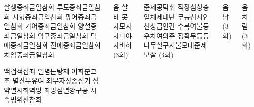 \documentclass[20pt, a0paper ]{tikzposter}
\begin{document}
\begin{columns}
{				\begin{LARGE}
살생중죄금일참회 투도중죄금일참회 사행중죄금일참회
망어중죄금일참회 기어중죄금일참회 양설중죄금일참회
악구중죄금일참회 탐애중죄금일참회 진애중죄금일참회
치암중죄금일참회

백겁적집죄 일념돈탕제 여화분고초 멸진무유여
죄무자성종심기 심약멸시죄역망 죄망심멸양구공 시즉명위진참회

				\end{LARGE}

			}



			{
				\begin{LARGE}
옴 살바 못자모지 사다야 사바하 (3회)
				\end{LARGE}

			}



			{
				\begin{LARGE}

준제공덕취 적정심상송 일체제대난 무능침시인
천상급인간 수복여불등 우차여의주 정획무등등
나무칠구지불모대준제보살 (3회)


				\end{LARGE}

			}



			{
				\begin{LARGE}
옴 남(3회)
				\end{LARGE}

			}



			{
				\begin{LARGE}
옴치림(3회)
				\end{LARGE}
			}




\end{columns}
\end{document}
